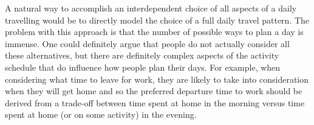 
A natural way to accomplish an interdependent choice of all aspects of a daily travelling would be to directly model the choice of a full daily travel pattern.
The problem with this approach is that the number of possible ways to plan a day is immense. One could definitely argue that people do not actually consider all these alternatives, but there are definitely complex aspects of the activity schedule that do influence how people plan their days. For example, when considering what time to leave for work, they are likely to take into consideration when they will get home and so the preferred departure time to work should be derived from a trade-off between time spent at home in the morning versus time spent at home (or on some activity) in the evening.


